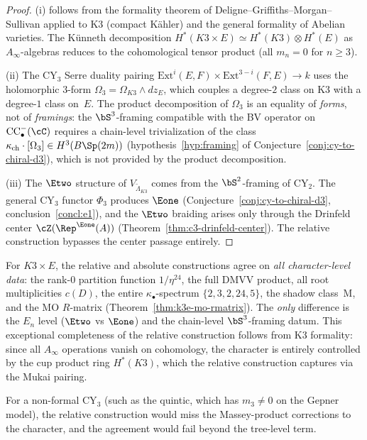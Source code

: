 \begin{proof}
(i) follows from the formality theorem of Deligne--Griffiths--Morgan--Sullivan
applied to K3 (compact K\"ahler) and the general formality of Abelian
varieties.  The K\"unneth decomposition
$H^*(K3 \times E) \simeq H^*(K3) \otimes H^*(E)$ as $A_\infty$-algebras
reduces to the cohomological tensor product (all $m_n = 0$ for $n \geq 3$).

(ii) The CY$_3$ Serre duality pairing
$\mathrm{Ext}^i(E, F) \times \mathrm{Ext}^{3-i}(F, E) \to k$
uses the holomorphic $3$-form $\Omega_3 = \Omega_{K3} \wedge dz_E$,
which couples a degree-$2$ class on K3 with a degree-$1$ class on~$E$.
The product decomposition of $\Omega_3$ is an equality of
\emph{forms}, not of \emph{framings}: the $\bS^3$-framing compatible
with the BV operator on $\mathrm{CC}_\bullet^-(\cC)$ requires a
chain-level trivialization of the class
$\kappa_{\mathrm{ch}} \cdot [\Omega_3] \in H^3(B\Sp(2m))$
(hypothesis~\ref{hyp:framing} of Conjecture~\ref{conj:cy-to-chiral-d3}),
which is not provided by the product decomposition.

(iii) The $\Etwo$ structure of $V_{\widetilde{\Lambda}_{K3}}$ comes
from the $\bS^2$-framing of CY$_2$.  The general CY$_3$ functor
$\Phi_3$ produces $\Eone$ (Conjecture~\ref{conj:cy-to-chiral-d3},
conclusion~\ref{concl:e1}), and the $\Etwo$ braiding arises only
through the Drinfeld center
$\cZ(\Rep^{\Eone}(A))$ (Theorem~\ref{thm:c3-drinfeld-center}).
The relative construction bypasses the center passage entirely.
\end{proof}

\begin{remark}
\label{rem:k3xe-well-behaved-standalone}
For $K3 \times E$, the relative and absolute constructions agree on
\emph{all character-level data}: the rank-$0$ partition function
$1/\eta^{24}$, the full DMVV product, all root multiplicities $c(D)$,
the entire $\kappa_\bullet$-spectrum $\{2, 3, 2, 24, 5\}$, the shadow class~M,
and the MO $R$-matrix (Theorem~\ref{thm:k3e-mo-rmatrix}).  The
\emph{only} difference is the $E_n$ level ($\Etwo$ vs $\Eone$) and
the chain-level $\bS^3$-framing datum.  This exceptional completeness
of the relative construction follows from K3 formality: since all
$A_\infty$ operations vanish on cohomology, the character is entirely
controlled by the cup product ring $H^*(K3)$, which the relative
construction captures via the Mukai pairing.

For a non-formal CY$_3$ (such as the quintic, which has $m_3 \neq 0$
on the Gepner model), the relative construction would miss the
Massey-product corrections to the character, and the agreement would
fail beyond the tree-level term.
\end{remark}

